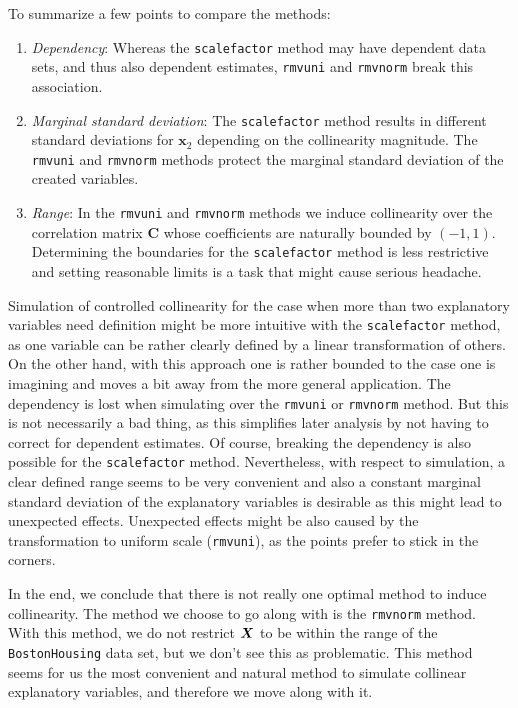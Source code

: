 \documentclass[11pt,a4paper,twoside]{book}\usepackage[]{graphicx}\usepackage[]{xcolor}
\begin{document}
To summarize a few points to compare the methods:
\begin{enumerate}
\item \textit{Dependency}: Whereas the \texttt{scalefactor} method may have dependent data sets, and thus also dependent estimates, \texttt{rmvuni} and \texttt{rmvnorm} break this association.
\item \textit{Marginal standard deviation}: The \texttt{scalefactor} method results in different standard deviations for $\boldsymbol{x}_2$ depending on the collinearity magnitude. The \texttt{rmvuni} and \texttt{rmvnorm} methods protect the marginal standard deviation of the created variables.
\item \textit{Range}: In the \texttt{rmvuni} and \texttt{rmvnorm} methods we induce collinearity over the correlation matrix $\boldsymbol{C}$ whose coefficients are naturally bounded by $\left(-1,1\right)$. Determining the boundaries for the \texttt{scalefactor} method is less restrictive and setting reasonable limits is a task that might cause serious headache.
\end{enumerate}

Simulation of controlled collinearity for the case when more than two explanatory variables need definition might be more intuitive with the \texttt{scalefactor} method, as one variable can be rather clearly defined by a linear transformation of others.
On the other hand, with this approach one is rather bounded to the case one is imagining and moves a bit away from the more general application.
The dependency is lost when simulating over the \texttt{rmvuni} or \texttt{rmvnorm} method. But this is not necessarily a bad thing, as this simplifies later analysis by not having to correct for dependent estimates.
Of course, breaking the dependency is also possible for the \texttt{scalefactor} method. Nevertheless, with respect to simulation, a clear defined range seems to be very convenient and also a constant marginal standard deviation of the explanatory variables is desirable as this might lead to unexpected effects.
Unexpected effects might be also caused by the transformation to uniform scale (\texttt{rmvuni}), as the points prefer to stick in the corners.

In the end, we conclude that there is not really one optimal method to induce collinearity.
The method we choose to go along with is the \texttt{rmvnorm} method.
With this method, we do not restrict ${\boldsymbol{X}}$ to be within the range of the \texttt{BostonHousing} data set, but we don't see this as problematic.
This method seems for us the most convenient and natural method to simulate collinear explanatory variables, and therefore we move along with it.
\end{document}
